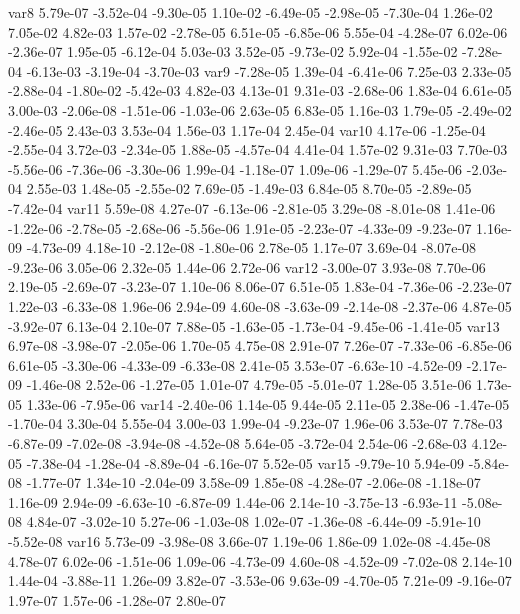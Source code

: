 var8  5.79e-07 -3.52e-04 -9.30e-05  1.10e-02 -6.49e-05 -2.98e-05 -7.30e-04  1.26e-02  7.05e-02  4.82e-03  1.57e-02 -2.78e-05  6.51e-05 -6.85e-06  5.55e-04 -4.28e-07  6.02e-06 -2.36e-07  1.95e-05 -6.12e-04  5.03e-03  3.52e-05 -9.73e-02  5.92e-04 -1.55e-02 -7.28e-04 -6.13e-03 -3.19e-04 -3.70e-03
var9 -7.28e-05  1.39e-04 -6.41e-06  7.25e-03  2.33e-05 -2.88e-04 -1.80e-02 -5.42e-03  4.82e-03  4.13e-01  9.31e-03 -2.68e-06  1.83e-04  6.61e-05  3.00e-03 -2.06e-08 -1.51e-06 -1.03e-06  2.63e-05  6.83e-05  1.16e-03  1.79e-05 -2.49e-02 -2.46e-05  2.43e-03  3.53e-04  1.56e-03  1.17e-04  2.45e-04
var10  4.17e-06 -1.25e-04 -2.55e-04  3.72e-03 -2.34e-05  1.88e-05 -4.57e-04  4.41e-04  1.57e-02  9.31e-03  7.70e-03 -5.56e-06 -7.36e-06 -3.30e-06  1.99e-04 -1.18e-07  1.09e-06 -1.29e-07  5.45e-06 -2.03e-04  2.55e-03  1.48e-05 -2.55e-02  7.69e-05 -1.49e-03  6.84e-05  8.70e-05 -2.89e-05 -7.42e-04
var11  5.59e-08  4.27e-07 -6.13e-06 -2.81e-05  3.29e-08 -8.01e-08  1.41e-06 -1.22e-06 -2.78e-05 -2.68e-06 -5.56e-06  1.91e-05 -2.23e-07 -4.33e-09 -9.23e-07  1.16e-09 -4.73e-09  4.18e-10 -2.12e-08 -1.80e-06  2.78e-05  1.17e-07  3.69e-04 -8.07e-08 -9.23e-06  3.05e-06  2.32e-05  1.44e-06  2.72e-06
var12 -3.00e-07  3.93e-08  7.70e-06  2.19e-05 -2.69e-07 -3.23e-07  1.10e-06  8.06e-07  6.51e-05  1.83e-04 -7.36e-06 -2.23e-07  1.22e-03 -6.33e-08  1.96e-06  2.94e-09  4.60e-08 -3.63e-09 -2.14e-08 -2.37e-06  4.87e-05 -3.92e-07  6.13e-04  2.10e-07  7.88e-05 -1.63e-05 -1.73e-04 -9.45e-06 -1.41e-05
var13  6.97e-08 -3.98e-07 -2.05e-06  1.70e-05  4.75e-08  2.91e-07  7.26e-07 -7.33e-06 -6.85e-06  6.61e-05 -3.30e-06 -4.33e-09 -6.33e-08  2.41e-05  3.53e-07 -6.63e-10 -4.52e-09 -2.17e-09 -1.46e-08  2.52e-06 -1.27e-05  1.01e-07  4.79e-05 -5.01e-07  1.28e-05  3.51e-06  1.73e-05  1.33e-06 -7.95e-06
var14 -2.40e-06  1.14e-05  9.44e-05  2.11e-05  2.38e-06 -1.47e-05 -1.70e-04  3.30e-04  5.55e-04  3.00e-03  1.99e-04 -9.23e-07  1.96e-06  3.53e-07  7.78e-03 -6.87e-09 -7.02e-08 -3.94e-08 -4.52e-08  5.64e-05 -3.72e-04  2.54e-06 -2.68e-03  4.12e-05 -7.38e-04 -1.28e-04 -8.89e-04 -6.16e-07  5.52e-05
var15 -9.79e-10  5.94e-09 -5.84e-08 -1.77e-07  1.34e-10 -2.04e-09  3.58e-09  1.85e-08 -4.28e-07 -2.06e-08 -1.18e-07  1.16e-09  2.94e-09 -6.63e-10 -6.87e-09  1.44e-06  2.14e-10 -3.75e-13 -6.93e-11 -5.08e-08  4.84e-07 -3.02e-10  5.27e-06 -1.03e-08  1.02e-07 -1.36e-08 -6.44e-09 -5.91e-10 -5.52e-08
var16  5.73e-09 -3.98e-08  3.66e-07  1.19e-06  1.86e-09  1.02e-08 -4.45e-08  4.78e-07  6.02e-06 -1.51e-06  1.09e-06 -4.73e-09  4.60e-08 -4.52e-09 -7.02e-08  2.14e-10  1.44e-04 -3.88e-11  1.26e-09  3.82e-07 -3.53e-06  9.63e-09 -4.70e-05  7.21e-09 -9.16e-07  1.97e-07  1.57e-06 -1.28e-07  2.80e-07
